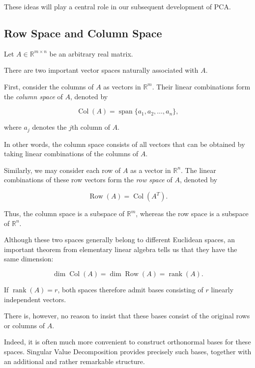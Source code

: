 \documentclass[11pt]{article}
\begin{document}
These ideas will play a central role in our
subsequent development of PCA.

\subsection{Row Space and Column Space}

Let $A\in\mathbb{R}^{m\times n}$ be an arbitrary
real matrix.

There are two important vector spaces naturally
associated with $A$.

First, consider the columns of $A$ as vectors
in $\mathbb{R}^m$. Their linear combinations
form the \textit{column space} of $A$, denoted by

\[
\operatorname{Col}(A)
=
\operatorname{span}\{a_1,a_2,\ldots,a_n\},
\]

where $a_j$ denotes the $j$th column of $A$.

In other words, the column space consists of
all vectors that can be obtained by taking
linear combinations of the columns of $A$.

Similarly, we may consider each row of $A$
as a vector in $\mathbb{R}^n$.
The linear combinations of these row vectors
form the \textit{row space} of $A$, denoted by

\[
\operatorname{Row}(A)
=
\operatorname{Col}(A^T).
\]

Thus, the column space is a subspace of
$\mathbb{R}^m$, whereas the row space is
a subspace of $\mathbb{R}^n$.

Although these two spaces generally belong
to different Euclidean spaces, an important
theorem from elementary linear algebra tells
us that they have the same dimension:

\[
\boxed{
\dim\operatorname{Col}(A)
=
\dim\operatorname{Row}(A)
=
\operatorname{rank}(A).
}
\]

If $\operatorname{rank}(A)=r$, both spaces
therefore admit bases consisting of
$r$ linearly independent vectors.

There is, however, no reason to insist
that these bases consist of the original
rows or columns of $A$.

Indeed, it is often much more convenient
to construct orthonormal bases for these
spaces. Singular Value Decomposition provides
precisely such bases, together with an
additional and rather remarkable structure.

\end{document}

